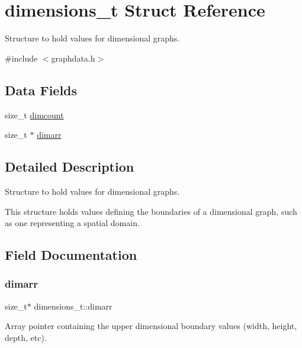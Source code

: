 \hypertarget{structdimensions__t}{}\section{dimensions\+\_\+t Struct Reference}
\label{structdimensions__t}


Structure to hold values for dimensional graphs.  




{\ttfamily \#include $<$graphdata.\+h$>$}

\subsection*{Data Fields}
\begin{DoxyCompactItemize}
\item 
size\+\_\+t \hyperlink{structdimensions__t_a025871853cf8339459bab76ea0f6fef6}{dimcount}
\item 
size\+\_\+t $\ast$ \hyperlink{structdimensions__t_ac9048802def4d663bf295c5b662a3b49}{dimarr}
\end{DoxyCompactItemize}


\subsection{Detailed Description}
Structure to hold values for dimensional graphs. 

This structure holds values defining the boundaries of a dimensional graph, such as one representing a spatial domain. 

\subsection{Field Documentation}
\mbox{\label{structdimensions__t_ac9048802def4d663bf295c5b662a3b49}} 
\subsubsection{\texorpdfstring{dimarr}{dimarr}}
{\footnotesize\ttfamily size\+\_\+t$\ast$ dimensions\+\_\+t\+::dimarr}

Array pointer containing the upper dimensional boundary values (width, height, depth, etc). \mbox{\label{structdimensions__t_a025871853cf8339459bab76ea0f6fef6}} 
